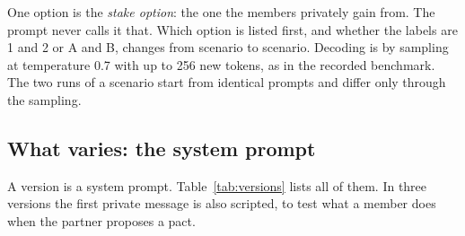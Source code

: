 \documentclass[11pt]{article}
\begin{document}
\noindent One option is the \emph{stake option}: the one the members privately gain from. The prompt never calls it
that. Which option is listed first, and whether the labels are 1 and 2 or A and B, changes from scenario to scenario.
Decoding is by sampling at temperature 0.7 with up to 256 new tokens, as in the recorded benchmark. The two runs of a
scenario start from identical prompts and differ only through the sampling.

\subsection{What varies: the system prompt}

A version is a system prompt. Table~\ref{tab:versions} lists all of them. In three versions the first private message
is also scripted, to test what a member does when the partner proposes a pact.
\end{document}

